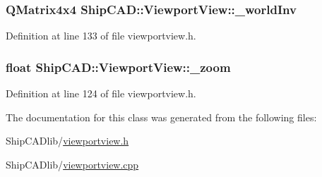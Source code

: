 \subsubsection[{\texorpdfstring{\+\_\+world\+Inv}{_worldInv}}]{\setlength{\rightskip}{0pt plus 5cm}Q\+Matrix4x4 Ship\+C\+A\+D\+::\+Viewport\+View\+::\+\_\+world\+Inv\hspace{0.3cm}{\ttfamily [protected]}}\hypertarget{classShipCAD_1_1ViewportView_a6b16d2dd6a5c1b812e9fa96dfcadebbb}{}\label{classShipCAD_1_1ViewportView_a6b16d2dd6a5c1b812e9fa96dfcadebbb}


Definition at line 133 of file viewportview.\+h.

\subsubsection[{\texorpdfstring{\+\_\+zoom}{_zoom}}]{\setlength{\rightskip}{0pt plus 5cm}float Ship\+C\+A\+D\+::\+Viewport\+View\+::\+\_\+zoom\hspace{0.3cm}{\ttfamily [protected]}}\hypertarget{classShipCAD_1_1ViewportView_a337e90ffddd63535bad9b8de652a455a}{}\label{classShipCAD_1_1ViewportView_a337e90ffddd63535bad9b8de652a455a}


Definition at line 124 of file viewportview.\+h.



The documentation for this class was generated from the following files\+:\begin{DoxyCompactItemize}
\item 
Ship\+C\+A\+Dlib/\hyperlink{viewportview_8h}{viewportview.\+h}\item 
Ship\+C\+A\+Dlib/\hyperlink{viewportview_8cpp}{viewportview.\+cpp}\end{DoxyCompactItemize}
